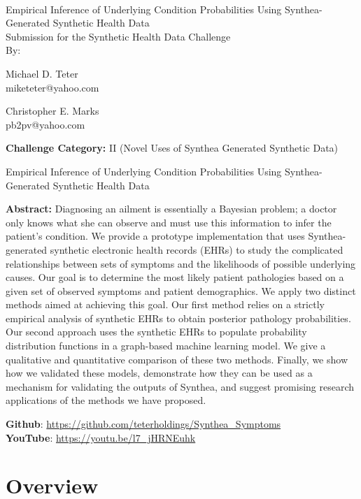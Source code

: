 \documentclass[11pt]{article}
\newcommand{\solutiontitle}{Empirical Inference of Underlying Condition Probabilities Using Synthea-Generated Synthetic Health Data}
\newcommand{\challengecategory}{II (Novel Uses of Synthea Generated Synthetic Data)}
\newcommand{\ABSTRACT}{Diagnosing an ailment is essentially a Bayesian problem; a doctor only knows what she can observe and must use this information to infer the patient's condition.  We provide a prototype implementation that uses Synthea-generated synthetic electronic health records (EHRs) to study the complicated relationships between sets of symptoms and the likelihoods of possible underlying causes.  Our goal is to determine the most likely patient pathologies based on a given set of observed symptoms and patient demographics. We apply two distinct methods aimed at achieving this goal.  Our first method relies on a strictly empirical analysis of synthetic EHRs to obtain posterior pathology probabilities.  Our second approach uses the synthetic EHRs to populate probability distribution functions in a graph-based machine learning model.  We give a qualitative and quantitative comparison of these two methods.  Finally, we show how we validated these models, demonstrate how they can be used as a mechanism for validating the outputs of Synthea, and suggest promising research applications of the methods we have proposed.
}
\begin{document}

\thispagestyle{empty}

~

\begin{center}
    {\huge \solutiontitle} \\[24pt]
    {\Large Submission for the Synthetic Health Data Challenge} \\[24pt]
    {\Large By:} \\[24pt]
\end{center}

\begin{multicols}{2}
\begin{center}
	Michael D. Teter\\
	miketeter@yahoo.com
\end{center}

\columnbreak

\begin{center}
    Christopher E. Marks\\
    pb2pv@yahoo.com
\end{center}
\end{multicols}



\noindent \textbf{Challenge Category:} \challengecategory
\\


\clearpage


\setcounter{page}{1}

\begin{center}
  {\LARGE \solutiontitle}
  \\[11pt]
  \begin{minipage}{0.9\textwidth}
    \textbf{Abstract:}
    \ABSTRACT
  \end{minipage}
\end{center}
\vspace{11pt}

\noindent \textbf{Github}: \url{https://github.com/teterholdings/Synthea_Symptoms}\\
\noindent \textbf{YouTube}: \url{https://youtu.be/l7_jHRNEuhk}

\section{Overview} \label{sec: overview}
\end{document}
